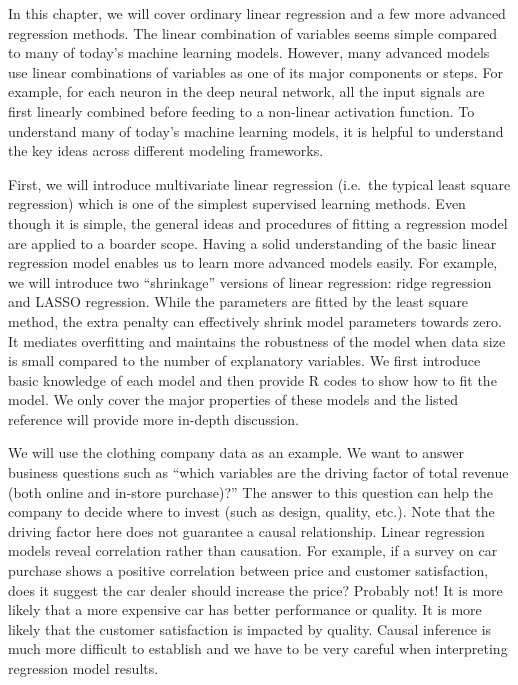 \documentclass[12pt,]{krantz}
\begin{document}
In this chapter, we will cover ordinary linear regression and a few more advanced regression methods. The linear combination of variables seems simple compared to many of today's machine learning models. However, many advanced models use linear combinations of variables as one of its major components or steps. For example, for each neuron in the deep neural network, all the input signals are first linearly combined before feeding to a non-linear activation function. To understand many of today's machine learning models, it is helpful to understand the key ideas across different modeling frameworks.

First, we will introduce multivariate linear regression (i.e.~the typical least square regression) which is one of the simplest supervised learning methods. Even though it is simple, the general ideas and procedures of fitting a regression model are applied to a boarder scope. Having a solid understanding of the basic linear regression model enables us to learn more advanced models easily. For example, we will introduce two ``shrinkage'' versions of linear regression: ridge regression and LASSO regression. While the parameters are fitted by the least square method, the extra penalty can effectively shrink model parameters towards zero. It mediates overfitting and maintains the robustness of the model when data size is small compared to the number of explanatory variables. We first introduce basic knowledge of each model and then provide R codes to show how to fit the model. We only cover the major properties of these models and the listed reference will provide more in-depth discussion.

We will use the clothing company data as an example. We want to answer business questions such as ``which variables are the driving factor of total revenue (both online and in-store purchase)?'' The answer to this question can help the company to decide where to invest (such as design, quality, etc.). Note that the driving factor here does not guarantee a causal relationship. Linear regression models reveal correlation rather than causation. For example, if a survey on car purchase shows a positive correlation between price and customer satisfaction, does it suggest the car dealer should increase the price? Probably not! It is more likely that a more expensive car has better performance or quality. It is more likely that the customer satisfaction is impacted by quality. Causal inference is much more difficult to establish and we have to be very careful when interpreting regression model results.
\end{document}
